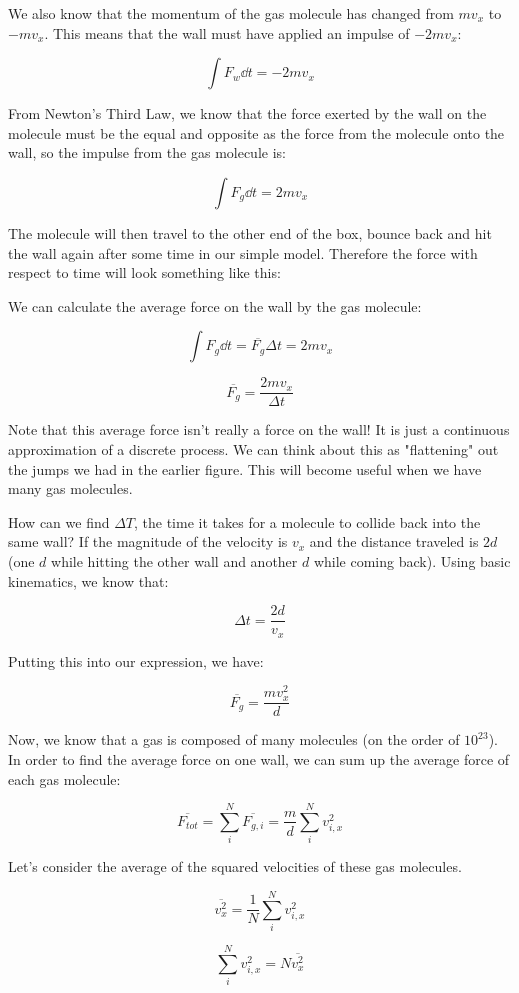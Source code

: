 \documentclass{report}
\begin{document}
We also know that the momentum of the gas molecule has changed from $mv_x$ to $-mv_x$. This means that the wall must have applied an impulse of $-2mv_x$:

$$\int F_{w}\dd t = -2mv_x$$

From Newton's Third Law, we know that the force exerted by the wall on the molecule must be the equal and opposite as the force from the molecule onto the wall, so the impulse from the gas molecule is:

 
$$\int F_{g}\dd t = 2mv_x$$


The molecule will then travel to the other end of the box, bounce back and hit the wall again after some time in our simple model. Therefore the force with respect to time will look something like this:


We can calculate the average force on the wall by the gas molecule:

$$\int F_{g}\dd t = \overline{F_g}\Delta t = 2mv_x$$

$$\overline{F_g} = \frac{2mv_x}{\Delta t}$$

Note that this average force isn't really a force on the wall! It is just a continuous approximation of a discrete process. We can think about this as "flattening" out the jumps we had in the earlier figure. This will become useful when we have many gas molecules.

How can we find $\Delta T$, the time it takes for a molecule to collide back into the same wall? If the magnitude of the velocity is $v_x$ and the distance traveled is $2d$ (one $d$ while hitting the other wall and another $d$ while coming back). Using basic kinematics, we know that:

$$\Delta t = \frac{2d}{v_x}$$

Putting this into our expression, we have:

$$\overline{F_g} = \frac{mv_x^2}{d}$$

Now, we know that a gas is composed of many molecules (on the order of $10^{23}$). In order to find the average force on one wall, we can sum up the average force of each gas molecule:

$$\overline{F_{tot}} = \sum_i^N\overline{F_{g,i}} = \frac{m}{d}\sum_i^Nv_{i,x}^2$$

Let's consider the average of the squared velocities of these gas molecules.

$$\overline{v_x^2} = \frac{1}{N}\sum_i^Nv_{i,x}^2 $$

$$\sum_i^Nv_{i,x}^2  = N\overline{v_x^2}$$
\end{document}
